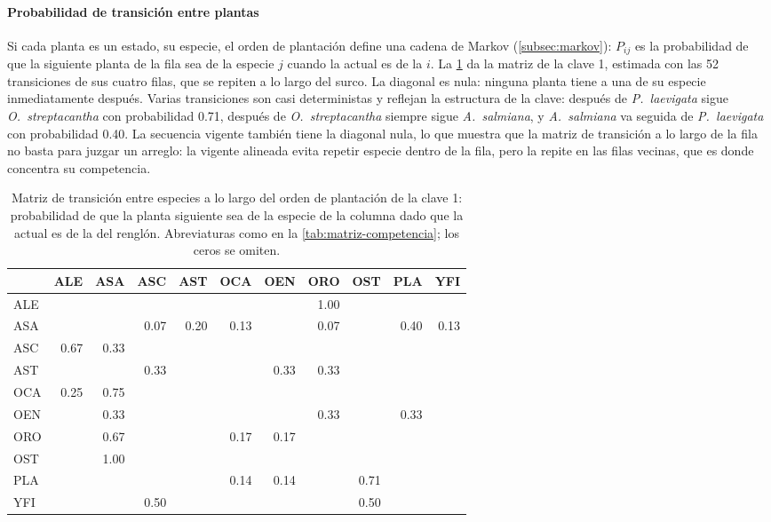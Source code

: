 \paragraph{Probabilidad de transición entre plantas} Si cada planta es un estado, su especie, el orden de plantación define una cadena de Markov (\cref{subsec:markov}): $P_{ij}$ es la probabilidad de que la siguiente planta de la fila sea de la especie $j$ cuando la actual es de la $i$. La \cref{tab:transicion} da la matriz de la clave 1, estimada con las 52 transiciones de sus cuatro filas, que se repiten a lo largo del surco. La diagonal es nula: ninguna planta tiene a una de su especie inmediatamente después. Varias transiciones son casi deterministas y reflejan la estructura de la clave: después de \textit{P.~laevigata} sigue \textit{O.~streptacantha} con probabilidad 0.71, después de \textit{O.~streptacantha} siempre sigue \textit{A.~salmiana}, y \textit{A.~salmiana} va seguida de \textit{P.~laevigata} con probabilidad 0.40. La secuencia vigente también tiene la diagonal nula, lo que muestra que la matriz de transición a lo largo de la fila no basta para juzgar un arreglo: la vigente alineada evita repetir especie dentro de la fila, pero la repite en las filas vecinas, que es donde concentra su competencia.

\begin{table}[t]
\centering
\caption{Matriz de transición entre especies a lo largo del orden de plantación de la clave 1: probabilidad de que la planta siguiente sea de la especie de la columna dado que la actual es de la del renglón. Abreviaturas como en la \cref{tab:matriz-competencia}; los ceros se omiten.}
\label{tab:transicion}
\small
\begin{tabular}{@{}lrrrrrrrrrr@{}}
\toprule
 & ALE & ASA & ASC & AST & OCA & OEN & ORO & OST & PLA & YFI \\
\midrule
ALE &      &      &      &      &      &      & 1.00 &      &      &      \\
ASA &      &      & 0.07 & 0.20 & 0.13 &      & 0.07 &      & 0.40 & 0.13 \\
ASC & 0.67 & 0.33 &      &      &      &      &      &      &      &      \\
AST &      &      & 0.33 &      &      & 0.33 & 0.33 &      &      &      \\
OCA & 0.25 & 0.75 &      &      &      &      &      &      &      &      \\
OEN &      & 0.33 &      &      &      &      & 0.33 &      & 0.33 &      \\
ORO &      & 0.67 &      &      & 0.17 & 0.17 &      &      &      &      \\
OST &      & 1.00 &      &      &      &      &      &      &      &      \\
PLA &      &      &      &      & 0.14 & 0.14 &      & 0.71 &      &      \\
YFI &      &      & 0.50 &      &      &      &      & 0.50 &      &      \\
\bottomrule
\end{tabular}
\end{table}

